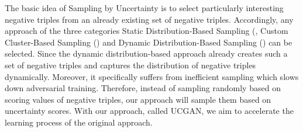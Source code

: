 The basic idea of Sampling by Uncertainty is to select particularly interesting negative triples from an already existing set of negative triples.
Accordingly, any approach of the three categories Static Distribution-Based Sampling (, Custom Cluster-Based Sampling () and Dynamic Distribution-Based Sampling () can be selected.
Since the dynamic distribution-based approach \kbgan already creates such a set of negative triples and captures the distribution of negative triples dynamically.
Moreover, it specifically suffers from inefficient sampling which slows down adversarial training.
Therefore, instead of sampling randomly based on scoring values of negative triples, our approach will sample them based on uncertainty scores.
With our approach, called \ac{UCGAN}, we aim to accelerate the learning process of the original \kbgan approach.












